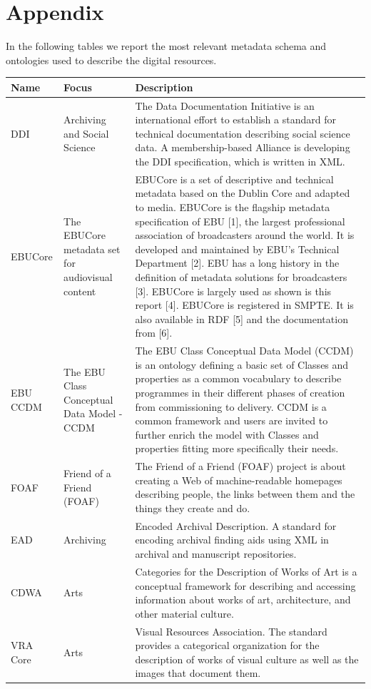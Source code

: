 \documentclass[epsfig,a4paper,12pt,titlepage]{book}
\begin{document}
\appendix

\chapter{Appendix}
\label{appendix}

In the following tables we report the most relevant metadata schema and ontologies used to describe the digital resources. 
\begin{table}[H]
\small
    \centering
    \begin{adjustbox}{width=\textwidth}
    \begin{tabular}{|p{1.5cm}|p{3.5cm}|p{14.0cm}|} \hline
    Name & Focus & Description \\ \hline
DDI & Archiving and Social Science & The Data Documentation Initiative is an international effort to establish a standard for technical documentation describing social science data. A membership-based Alliance is developing the DDI specification, which is written in XML. \\ \hline
EBUCore & The EBUCore metadata set for audiovisual content & EBUCore is a set of descriptive and technical metadata based on the Dublin Core and adapted to media. EBUCore is the flagship metadata specification of EBU [1], the largest professional association of broadcasters around the world. It is developed and maintained by EBU's Technical Department [2]. EBU has a long history in the definition of metadata solutions for broadcasters [3]. EBUCore is largely used as shown is this report [4]. EBUCore is registered in SMPTE. It is also available in RDF [5] and the documentation from [6]. \\ \hline
EBU CCDM & The EBU Class Conceptual Data Model - CCDM & The EBU Class Conceptual Data Model (CCDM) is an ontology defining a basic set of Classes and properties as a common vocabulary to describe programmes in their different phases of creation from commissioning to delivery. CCDM is a common framework and users are invited to further enrich the model with Classes and properties fitting more specifically their needs. \\ \hline
FOAF & Friend of a Friend (FOAF) & The Friend of a Friend (FOAF) project is about creating a Web of machine-readable homepages describing people, the links between them and the things they create and do. \\ \hline
EAD & Archiving & Encoded Archival Description.  A standard for encoding archival finding aids using XML in archival and manuscript repositories. \\ \hline
CDWA & Arts & Categories for the Description of Works of Art is a conceptual framework for describing and accessing information about works of art, architecture, and other material culture. \\ \hline
VRA Core & Arts & Visual Resources Association. The standard provides a categorical organization for the description of works of visual culture as well as the images that document them. \\ \hline


\end{tabular}
\end{adjustbox}
\end{table}
\end{document}
